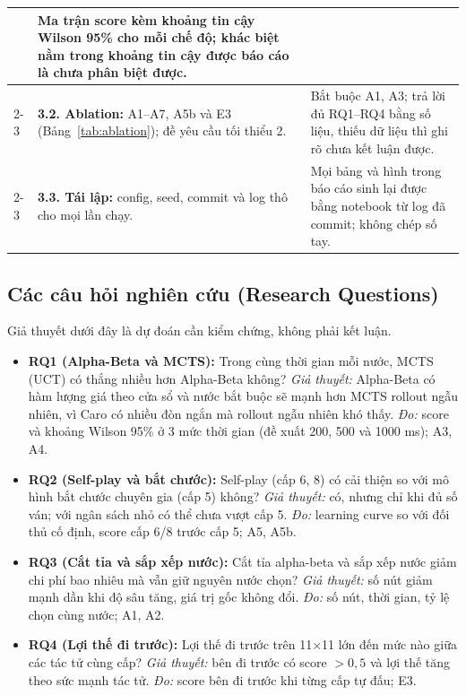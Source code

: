 \documentclass[12pt,a4paper]{report}
\newenvironment{gon}{\begin{itemize}\setlength{\itemsep}{2pt}\setlength{\parskip}{0pt}}{\end{itemize}}
\begin{document}
{\begin{longtable}{@{}p{} p{} p{}@{}}
  & Ma trận score kèm khoảng tin cậy Wilson 95\% cho mỗi chế độ; khác biệt nằm trong khoảng tin cậy được báo cáo là chưa phân biệt được. \\
  \cmidrule{2-3}
  & \textbf{3.2. Ablation:} A1--A7, A5b và E3 (Bảng~\ref{tab:ablation}); đề yêu cầu tối thiểu 2.
  & Bắt buộc A1, A3; trả lời đủ RQ1--RQ4 bằng số liệu, thiếu dữ liệu thì ghi rõ chưa kết luận được. \\
  \cmidrule{2-3}
  & \textbf{3.3. Tái lập:} config, seed, commit và log thô cho mọi lần chạy.
  & Mọi bảng và hình trong báo cáo sinh lại được bằng notebook từ log đã commit; không chép số tay. \\
  \bottomrule
\end{longtable}}

\subsection{Các câu hỏi nghiên cứu (Research Questions)}
Giả thuyết dưới đây là dự đoán cần kiểm chứng, không phải kết luận.
\begin{gon}
  \item \textbf{RQ1 (Alpha-Beta và MCTS):} Trong cùng thời gian mỗi nước, MCTS (UCT) có thắng nhiều hơn Alpha-Beta không? \textit{Giả thuyết:} Alpha-Beta có hàm lượng giá theo cửa sổ và nước bắt buộc sẽ mạnh hơn MCTS rollout ngẫu nhiên, vì Caro có nhiều đòn ngắn mà rollout ngẫu nhiên khó thấy. \textit{Đo:} score và khoảng Wilson 95\% ở 3 mức thời gian (đề xuất 200, 500 và \num{1000} ms); A3, A4.
  \item \textbf{RQ2 (Self-play và bắt chước):} Self-play (cấp 6, 8) có cải thiện so với mô hình bắt chước chuyên gia (cấp 5) không? \textit{Giả thuyết:} có, nhưng chỉ khi đủ số ván; với ngân sách nhỏ có thể chưa vượt cấp 5. \textit{Đo:} learning curve so với đối thủ cố định, score cấp 6/8 trước cấp 5; A5, A5b.
  \item \textbf{RQ3 (Cắt tỉa và sắp xếp nước):} Cắt tỉa alpha-beta và sắp xếp nước giảm chi phí bao nhiêu mà vẫn giữ nguyên nước chọn? \textit{Giả thuyết:} số nút giảm mạnh dần khi độ sâu tăng, giá trị gốc không đổi. \textit{Đo:} số nút, thời gian, tỷ lệ chọn cùng nước; A1, A2.
  \item \textbf{RQ4 (Lợi thế đi trước):} Lợi thế đi trước trên 11×11 lớn đến mức nào giữa các tác tử cùng cấp? \textit{Giả thuyết:} bên đi trước có score $> 0{,}5$ và lợi thế tăng theo sức mạnh tác tử. \textit{Đo:} score bên đi trước khi từng cấp tự đấu; E3.
\end{gon}
\end{document}
